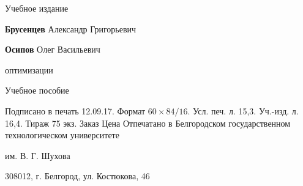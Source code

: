 \newpage
\center

 \par\bigskip
\vspace*{10.5em plus .6em minus .5em}

Учебное издание
\vspace*{2.5em plus .6em minus .5em}

\textbf{Брусенцев} Александр Григорьевич

\textbf{Осипов} Олег Васильевич
 \vspace*{4.5em plus .6em minus .5em}

 оптимизации\normalsize
\vspace*{1.5em plus .6em minus .5em}

Учебное пособие
\vspace*{10.5em plus .6em minus .5em}

\small
Подписано в печать 12.09.17. Формат $60 \times 84/16$. Усл. печ. л. 15,3. Уч.-изд. л. 16,4.
Тираж 75 экз.                                         Заказ                                                    Цена
Отпечатано в Белгородском государственном технологическом университете

им. В. Г. Шухова

308012, г. Белгород, ул. Костюкова, 46
\normalsize
\flushleft
